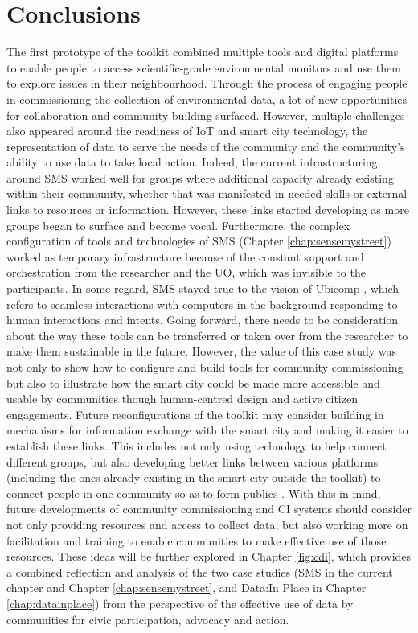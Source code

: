 \section{Conclusions}
The first prototype of the toolkit combined multiple tools and digital platforms to enable people to access scientific-grade environmental monitors and use them to explore issues in their neighbourhood. Through the process of engaging people in commissioning the collection of environmental data, a lot of new opportunities for collaboration and community building surfaced. However, multiple challenges also appeared around the readiness of IoT and smart city technology, the representation of data to serve the needs of the community and the community's ability to use data to take local action. Indeed, the current infrastructuring around SMS worked well for groups where additional capacity already existing within their community, whether that was manifested in needed skills or external links to resources or information. However, these links started developing as more groups began to surface and become vocal. Furthermore, the complex configuration of tools and technologies of SMS (Chapter \ref{chap:sensemystreet}) worked as temporary infrastructure because of the constant support and orchestration from the researcher and the UO, which was invisible to the participants. In some regard, SMS stayed true to the vision of Ubicomp \citep{weiser_computer_1991}, which refers to seamless interactions with computers in the background responding to human interactions and intents. Going forward, there needs to be consideration about the way these tools can be transferred or taken over from the researcher to make them sustainable in the future. However, the value of this case study was not only to show how to configure and build tools for community commissioning but also to illustrate how the smart city could be made more accessible and usable by communities though human-centred design and active citizen engagements. Future reconfigurations of the toolkit may consider building in mechanisms for information exchange with the smart city and making it easier to establish these links. This includes not only using technology to help connect different groups, but also developing better links between various platforms (including the ones already existing in the smart city outside the toolkit) to connect people in one community so as to form publics \citep{dewey_public_1954}. With this in mind, future developments of community commissioning and CI systems should consider not only providing resources and access to collect data, but also working more on facilitation and training to enable communities to make effective use of those resources. These ideas will be further explored in Chapter \ref{fig:cdi}, which provides a combined reflection and analysis of the two case studies (SMS in the current chapter and Chapter \ref{chap:sensemystreet}, and Data:In Place in Chapter \ref{chap:datainplace}) from the perspective of the effective use of data by communities for civic participation, advocacy and action.
\clearpage

